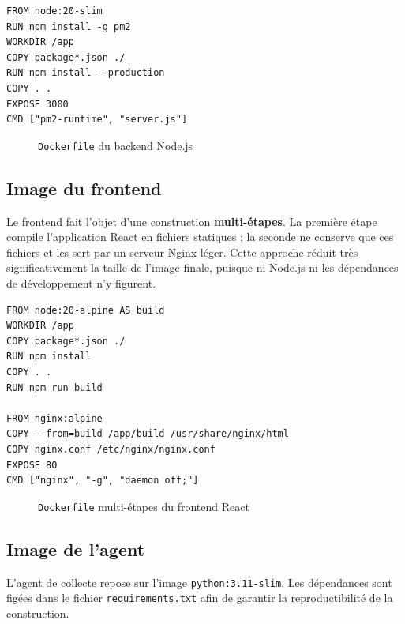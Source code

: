 \begin{lrbox}{\codebox}
\begin{minipage}{0.88\textwidth}
\begin{verbatim}
FROM node:20-slim
RUN npm install -g pm2
WORKDIR /app
COPY package*.json ./
RUN npm install --production
COPY . .
EXPOSE 3000
CMD ["pm2-runtime", "server.js"]
\end{verbatim}
\end{minipage}
\end{lrbox}
\begin{figure}[H]
\centering
\fbox{\usebox{\codebox}}
\caption{\texttt{Dockerfile} du backend Node.js}
\label{fig:dockerfile-back}
\end{figure}

\subsection{Image du frontend}
Le frontend fait l'objet d'une construction \textbf{multi-étapes}. La première étape
compile l'application React en fichiers statiques ; la seconde ne conserve que ces
fichiers et les sert par un serveur Nginx léger. Cette approche réduit très
significativement la taille de l'image finale, puisque ni Node.js ni les dépendances de
développement n'y figurent.

\begin{lrbox}{\codebox}
\begin{minipage}{0.88\textwidth}
\begin{verbatim}
FROM node:20-alpine AS build
WORKDIR /app
COPY package*.json ./
RUN npm install
COPY . .
RUN npm run build

FROM nginx:alpine
COPY --from=build /app/build /usr/share/nginx/html
COPY nginx.conf /etc/nginx/nginx.conf
EXPOSE 80
CMD ["nginx", "-g", "daemon off;"]
\end{verbatim}
\end{minipage}
\end{lrbox}
\begin{figure}[H]
\centering
\fbox{\usebox{\codebox}}
\caption{\texttt{Dockerfile} multi-étapes du frontend React}
\label{fig:dockerfile-front}
\end{figure}

\subsection{Image de l'agent}
L'agent de collecte repose sur l'image \texttt{python:3.11-slim}. Les dépendances sont
figées dans le fichier \texttt{requirements.txt} afin de garantir la reproductibilité de
la construction.

